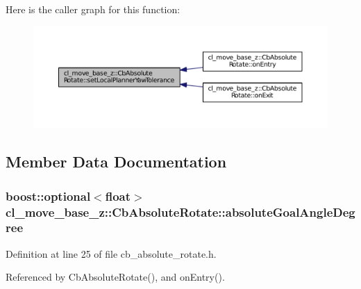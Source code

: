 Here is the caller graph for this function\+:
\nopagebreak
\begin{figure}[H]
\begin{center}
\leavevmode
\includegraphics[width=350pt]{classcl__move__base__z_1_1CbAbsoluteRotate_aba8d93d615ccd43acd0684f8e88e2209_icgraph}
\end{center}
\end{figure}




\subsection{Member Data Documentation}
\subsubsection[{\texorpdfstring{absolute\+Goal\+Angle\+Degree}{absoluteGoalAngleDegree}}]{\setlength{\rightskip}{0pt plus 5cm}boost\+::optional$<$float$>$ cl\+\_\+move\+\_\+base\+\_\+z\+::\+Cb\+Absolute\+Rotate\+::absolute\+Goal\+Angle\+Degree}\hypertarget{classcl__move__base__z_1_1CbAbsoluteRotate_ad5d0e21549940444e1cb525cda73329a}{}\label{classcl__move__base__z_1_1CbAbsoluteRotate_ad5d0e21549940444e1cb525cda73329a}


Definition at line 25 of file cb\+\_\+absolute\+\_\+rotate.\+h.



Referenced by Cb\+Absolute\+Rotate(), and on\+Entry().

